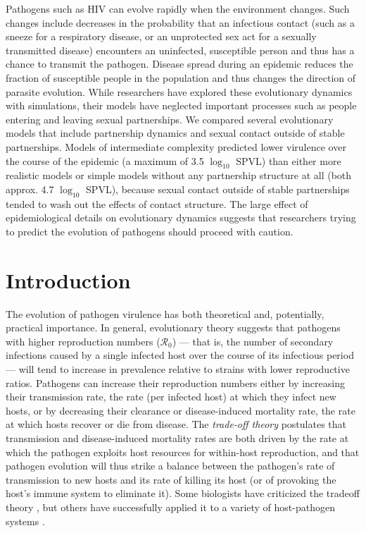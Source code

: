 \documentclass[10pt,letterpaper]{article}
\newcommand{\Lspvl}{$\log_{10}$ SPVL}
\newcommand{\rzero}{{\mathcal R}_0}
\begin{document}

Pathogens such as HIV can evolve rapidly when the environment changes.
Such changes include decreases in the probability that an infectious
contact (such as a sneeze for a respiratory disease, or an unprotected
sex act for a sexually transmitted disease) encounters an uninfected,
susceptible person and thus has a chance to transmit the
pathogen. Disease spread during an epidemic reduces the fraction of
susceptible people in the population and thus changes the direction of
parasite evolution.  While researchers have explored these
evolutionary dynamics with simulations, their models have neglected
important processes such as people entering and leaving sexual
partnerships. We compared several evolutionary models that include
partnership dynamics and sexual contact outside of stable
partnerships. Models of intermediate complexity predicted lower
virulence over the course of the epidemic (a maximum of 3.5 \Lspvl) than either more realistic models or simple models
without any partnership structure at all (both approx. 4.7 \Lspvl), because sexual contact outside of stable
partnerships tended to wash out the effects of contact
structure. The large effect of epidemiological details on evolutionary
dynamics suggests that researchers trying to predict the evolution of
pathogens should proceed with caution.

\linenumbers

\section*{Introduction}

The evolution of pathogen virulence has both 
theoretical and, potentially, practical
importance. In general, evolutionary theory suggests that
pathogens with higher reproduction numbers ($\rzero$) --- that is, the number of secondary infections caused by a single infected host over the course of its infectious period --- will tend to increase in prevalence relative to strains with lower reproductive ratios.
Pathogens can increase their reproduction numbers either
by increasing their transmission rate, 
the rate (per infected host) at which they
infect new hosts, or by decreasing their clearance or disease-induced
mortality rate, the rate
at which hosts recover or die from disease.
The \emph{trade-off theory} \cite{alizon_virulence_2009} postulates that
transmission and disease-induced mortality rates are both driven by the rate at which
the pathogen exploits host resources for within-host reproduction, 
and that pathogen
evolution will thus strike a balance between the
pathogen's rate of transmission
to new hosts and its rate of killing its host (or of provoking
the host's immune system to eliminate it).
Some biologists have criticized the tradeoff theory
\cite{EbertBull2003,alizon_adaptive_2015}, but others have
successfully applied it to a variety of host-pathogen systems \cite{Dwyer+1990,mackinnon1999genetic,jensen2006empirical,deroode2008virulence}.
\end{document}
